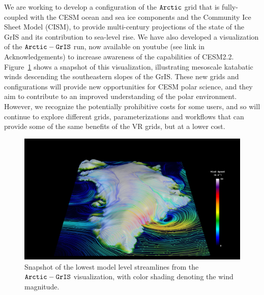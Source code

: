 \documentclass[draft]{agujournal2019}
\begin{document}
We are  working to develop a configuration of the $\tt Arctic$ grid that is fully-coupled with the CESM ocean and sea ice components and the Community Ice Sheet Model (CISM), to provide multi-century projections of the state of the GrIS and its contribution to sea-level rise. We have also developed a visualization of the $\tt Arctic-GrIS$ run, now available on youtube (see link in Acknowledgements) to increase awareness of the capabilities of CESM2.2. Figure~\ref{fig:viz} shows a snapshot of this visualization, illustrating mesoscale katabatic winds descending the southeastern slopes of the GrIS. These new grids and configurations will provide new opportunities for CESM polar science, and they aim to contribute to an improved understanding of the polar environment. However, we recognize the potentially prohibitive costs for some users, and so will continue to explore different grids, parameterizations and workflows that can provide some of the same benefits of the VR grids, but at a lower cost.

\begin{figure}[t]
\begin{center}
         \includegraphics[width=130mm]{Vis1472.jpg}
\end{center}
\caption{Snapshot of the lowest model level streamlines from the $\tt Arctic-GrIS$ visualization, with color shading denoting the wind magnitude.}
\label{fig:viz}
\end{figure}

%
%
%
%
\end{document}
